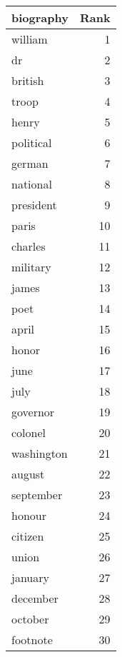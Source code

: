 \begin{table}
\label{tab:biography_terms}
\begin{tabular}{lr}
\toprule
biography & Rank \\
\midrule
william & 1 \\
dr & 2 \\
british & 3 \\
troop & 4 \\
henry & 5 \\
political & 6 \\
german & 7 \\
national & 8 \\
president & 9 \\
paris & 10 \\
charles & 11 \\
military & 12 \\
james & 13 \\
poet & 14 \\
april & 15 \\
honor & 16 \\
june & 17 \\
july & 18 \\
governor & 19 \\
colonel & 20 \\
washington & 21 \\
august & 22 \\
september & 23 \\
honour & 24 \\
citizen & 25 \\
union & 26 \\
january & 27 \\
december & 28 \\
october & 29 \\
footnote & 30 \\
\bottomrule
\end{tabular}
\end{table}
